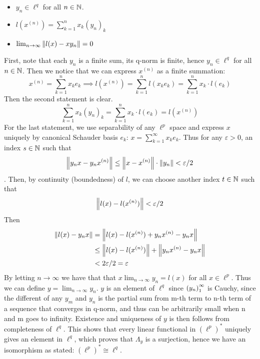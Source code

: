 \begin{theorem}
	\begin{itemize}
		\item $y_n\in\ell^q$ for all $n\in\mathbb{N}$. 
		\item $l(x^{(n)})=\sum_{k=1}^nx_k(y_n)_k$
		\item $\lim_{n\to\infty}\left\|{l(x)-xy_n}\right\|=0$
	\end{itemize}
	First, note that each $y_n$ is a finite sum, its q-norm is finite, hence $y_n\in\ell^q$ for all $n\in\mathbb{N}$.  Then we notice that we can express $x^(n)$ as a finite summation:
	$$
	x^{(n)}=\sum_{k=1}^nx_ke_k\implies l(x^{(n)})=\sum_{k=1}^nl(x_ke_k)=\sum_{k=1}^nx_k\cdot l(e_k)
	$$
	Then the second statement is clear.
	$$
	\sum_{k=1}^nx_k(y_n)_k=\sum_{k=1}^nx_k\cdot l(e_k)=l(x^{(n)})
	$$
	For the last statement, we use separability of any $\ell^p$ space and express $x$ uniquely by canonical Schauder basis $e_k$: $x=\sum_{k=1}^\infty x_ke_k$. Thus for any $\varepsilon>0$, an index $s\in\mathbb{N}$ such that 
	$$
	\left\|{y_nx-y_nx^{(n)}}\right\|\leq
	\left\|{x-x^{(n)}}\right\|\cdot\left\|{y_n}\right\|
	<\varepsilon/2
	$$.
	Then, by continuity (boundedness) of $l$, we can choose another index $t\in\mathbb{N}$ such that 
	$$
	\left\|{l(x)-l(x^{(n)})}\right\|<\varepsilon/2
	$$
	Then 
	\begin{equation}
		\begin{split}
			\left\|{l(x)-y_nx}\right\|&=\left\|{l(x)-l(x^{(n)})+y_nx^{(n)}-y_nx}\right\|\\
			&\leq\left\|{l(x)-l(x^{(n)})}\right\|+\left\|{y_nx^{(n)}-y_nx}\right\|\\
			&<2\varepsilon/2=\varepsilon
		\end{split}
	\end{equation}
	By letting $n\to\infty$ we have that that $x\lim_{n\to\infty}y_n=l(x)$ for all $x\in\ell^p$. Thus we can define $y=\lim_{n\to\infty}y_n$. $y$ is an element of $\ell^q$ since $\left({y_n}\right)_1^\infty$ is Cauchy, since the different of any $y_m$ and $y_n$ is the partial sum from m-th term to n-th term of a sequence that converges in q-norm, and thus can be arbitrarily small when n and m goes to infinity. Existence and uniqueness of $y$ is then follows from completeness of $\ell^q$. This shows that every linear functional in $(\ell^p)^*$ uniquely gives an element in $\ell^q$, which proves that $\Lambda_y$ is a surjection, hence we have an isomorphism as stated: $(\ell^p)^*\cong\ell^q$.
\end{theorem}


